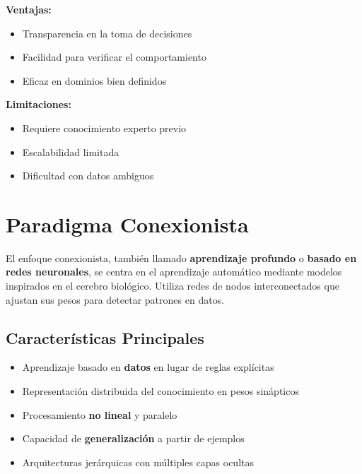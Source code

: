 \documentclass[14pt]{extarticle}
\begin{document}
  \textbf{Ventajas:}
  \begin{itemize}
    \item Transparencia en la toma de decisiones
    \item Facilidad para verificar el comportamiento
    \item Eficaz en dominios bien definidos
\end{itemize}

  \textbf{Limitaciones:}
  \begin{itemize}
    \item Requiere conocimiento experto previo
    \item Escalabilidad limitada
    \item Dificultad con datos ambiguos
  \end{itemize}

  \section*{Paradigma Conexionista}

  El enfoque conexionista, también llamado \textbf{aprendizaje profundo} o \textbf{basado en redes neuronales}, se centra en el aprendizaje automático mediante modelos inspirados en el cerebro biológico. Utiliza redes de nodos interconectados que ajustan sus pesos para detectar patrones en datos.

  \subsection*{Características Principales}
  \begin{itemize}
    \item Aprendizaje basado en \textbf{datos} en lugar de reglas explícitas
    \item Representación distribuida del conocimiento en pesos sinápticos
    \item Procesamiento \textbf{no lineal} y paralelo
    \item Capacidad de \textbf{generalización} a partir de ejemplos
    \item Arquitecturas jerárquicas con múltiples capas ocultas
  \end{itemize}
\end{document}
